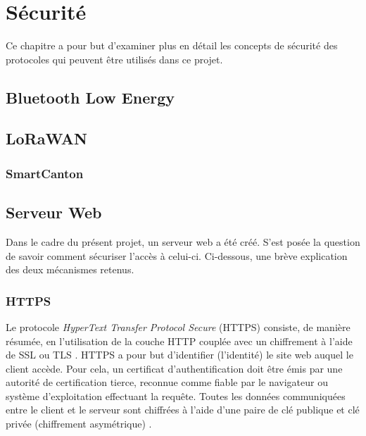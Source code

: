 \chapter{Sécurité}

Ce chapitre a pour but d'examiner plus en détail les concepts de sécurité des protocoles qui peuvent être utilisés dans ce projet. 



\section{Bluetooth Low Energy}
\label{sec-security_ble}



\newpage
\section{LoRaWAN}
\label{sec-security_lorawan}



\subsection{SmartCanton}
\label{sec-smartcanton_security}



\section{Serveur Web}

Dans le cadre du présent projet, un serveur web a été créé. S'est posée la question de savoir comment sécuriser l'accès à celui-ci. Ci-dessous, une brève explication des deux mécanismes retenus.

\subsection{HTTPS}

Le protocole \textit{HyperText Transfer Protocol Secure} (HTTPS) consiste, de manière résumée, en l'utilisation de la couche HTTP couplée avec un chiffrement à l'aide de SSL ou TLS \cite{HyperTex87:online}. HTTPS a pour but d'identifier (l'identité) le site web auquel le client accède. Pour cela, un certificat d'authentification doit être émis par une autorité de certification tierce, reconnue comme fiable par le navigateur ou système d'exploitation effectuant la requête. Toutes les données communiquées entre le client et le serveur sont chiffrées à l'aide d'une paire de clé publique et clé privée (chiffrement asymétrique) \cite{HyperTex87:online}.

